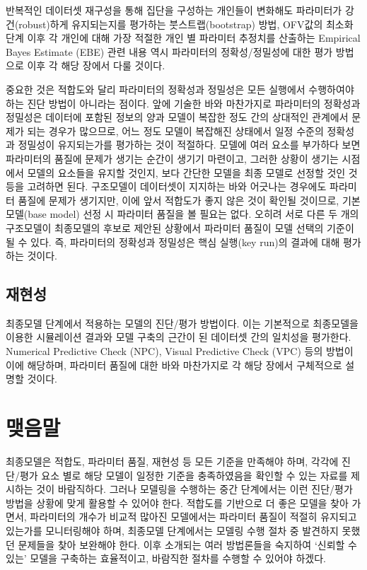 \documentclass[
  11pt,
  krantz2,
  a4paper]{krantz}
\theoremstyle{definition}
\theoremstyle{definition}
\theoremstyle{definition}
\theoremstyle{remark}
\begin{document}
반복적인 데이터셋 재구성을 통해 집단을 구성하는 개인들이 변화해도 파라미터가 강건(robust)하게 유지되는지를 평가하는 붓스트랩(bootstrap) 방법, OFV값의 최소화 단계 이후 각 개인에 대해 가장 적절한 개인 별 파라미터 추정치를 산출하는 Empirical Bayes Estimate (EBE) 관련 내용 역시 파라미터의 정확성/정밀성에 대한 평가 방법으로 이후 각 해당 장에서 다룰 것이다.

중요한 것은 적합도와 달리 파라미터의 정확성과 정밀성은 모든 실행에서 수행하여야 하는 진단 방법이 아니라는 점이다. 앞에 기술한 바와 마찬가지로 파라미터의 정확성과 정밀성은 데이터에 포함된 정보의 양과 모델이 복잡한 정도 간의 상대적인 관계에서 문제가 되는 경우가 많으므로, 어느 정도 모델이 복잡해진 상태에서 일정 수준의 정확성과 정밀성이 유지되는가를 평가하는 것이 적절하다. 모델에 여러 요소를 부가하다 보면 파라미터의 품질에 문제가 생기는 순간이 생기기 마련이고, 그러한 상황이 생기는 시점에서 모델의 요소들을 유지할 것인지, 보다 간단한 모델을 최종 모델로 선정할 것인 것 등을 고려하면 된다. 구조모델이 데이터셋이 지지하는 바와 어긋나는 경우에도 파라미터 품질에 문제가 생기지만, 이에 앞서 적합도가 좋지 않은 것이 확인될 것이므로, 기본모델(base model) 선정 시 파라미터 품질을 볼 필요는 없다. 오히려 서로 다른 두 개의 구조모델이 최종모델의 후보로 제안된 상황에서 파라미터 품질이 모델 선택의 기준이 될 수 있다. 즉, 파라미터의 정확성과 정밀성은 핵심 실행(key run)의 결과에 대해 평가하는 것이다.

\hypertarget{uxc7acuxd604uxc131}{%
\subsection{재현성}\label{uxc7acuxd604uxc131}}

최종모델 단계에서 적용하는 모델의 진단/평가 방법이다. 이는 기본적으로 최종모델을 이용한 시뮬레이션 결과와 모델 구축의 근간이 된 데이터셋 간의 일치성을 평가한다. Numerical Predictive Check (NPC), Visual Predictive Check (VPC) 등의 방법이 이에 해당하며, 파라미터 품질에 대한 바와 마찬가지로 각 해당 장에서 구체적으로 설명할 것이다.

\hypertarget{uxb9fauxc74cuxb9d0}{%
\section{맺음말}\label{uxb9fauxc74cuxb9d0}}

최종모델은 적합도, 파라미터 품질, 재현성 등 모든 기준을 만족해야 하며, 각각에 진단/평가 요소 별로 해당 모델이 일정한 기준을 충족하였음을 확인할 수 있는 자료를 제시하는 것이 바람직하다. 그러나 모델링을 수행하는 중간 단계에서는 이런 진단/평가 방법을 상황에 맞게 활용할 수 있어야 한다. 적합도를 기반으로 더 좋은 모델을 찾아 가면서, 파라미터의 개수가 비교적 많아진 모델에서는 파라미터 품질이 적절히 유지되고 있는가를 모니터링해야 하며, 최종모델 단계에서는 모델링 수행 절차 중 발견하지 못했던 문제들을 찾아 보완해야 한다. 이후 소개되는 여러 방법론들을 숙지하여 `신뢰할 수 있는' 모델을 구축하는 효율적이고, 바람직한 절차를 수행할 수 있어야 하겠다.
\end{document}
